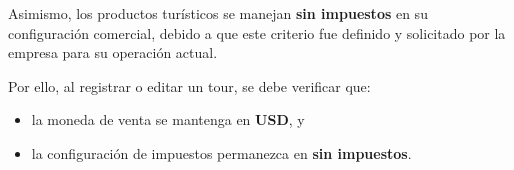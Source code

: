 \noindent Asimismo, los productos turísticos se manejan \textbf{sin impuestos} en su configuración comercial, debido a que este criterio fue definido y solicitado por la empresa para su operación actual.

\noindent Por ello, al registrar o editar un tour, se debe verificar que:
\begin{itemize}
    \item la moneda de venta se mantenga en \textbf{USD}, y
    \item la configuración de impuestos permanezca en \textbf{sin impuestos}.
\end{itemize}
